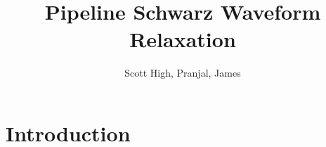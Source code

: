 \documentclass{svmult-ddm}
\begin{document}
\title*{Pipeline Schwarz Waveform Relaxation}

\author{Scott High, Pranjal, James}

\maketitle



\section{Introduction}
\label{prop_sec:introduction}
\end{document}
